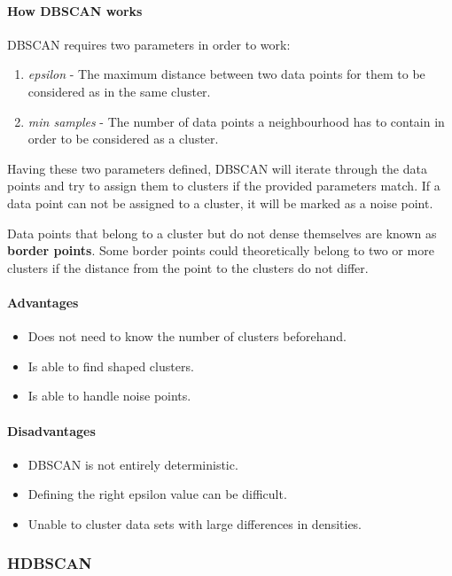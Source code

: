\paragraph{How DBSCAN works}
DBSCAN requires two parameters in order to work:

\begin{enumerate}
    \item \textit{epsilon} - The maximum distance between two data points for them to be considered as in the same cluster.
    \item \textit{min samples} - The number of data points a neighbourhood has to contain in order to be considered as a cluster.
\end{enumerate}

Having these two parameters defined, DBSCAN will iterate through the data points
and try to assign them to clusters if the provided parameters match.
If a data point can not be assigned to a cluster, it will be marked as a noise point.

Data points that belong to a cluster but do not dense themselves are known as \textbf{border points}.
Some border points could theoretically belong to two or more clusters
if the distance from the point to the clusters do not differ.

\paragraph{Advantages}
\begin{itemize}
    \item Does not need to know the number of clusters beforehand.
    \item Is able to find shaped clusters.
    \item Is able to handle noise points.
\end{itemize}

\paragraph{Disadvantages}
\begin{itemize}
    \item DBSCAN is not entirely deterministic.
    \item Defining the right epsilon value can be difficult.
    \item Unable to cluster data sets with large differences in densities.
\end{itemize}

\subsubsection{HDBSCAN}
\label{subsubsec:3_hdbscan}

